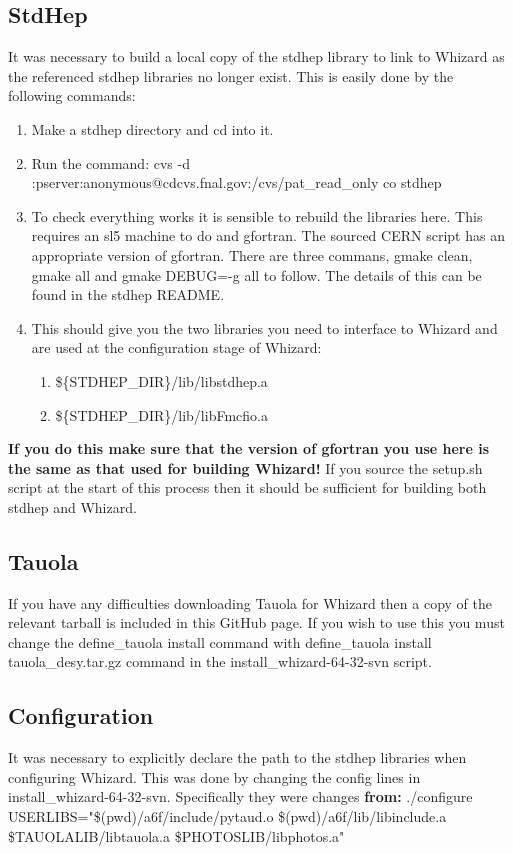 \documentclass[11pt, oneside]{article}   	%
\begin{document}
\subsection{StdHep}
It was necessary to build a local copy of the stdhep library to link to Whizard as the referenced stdhep libraries no longer exist.  This is easily done by the following commands:
\begin{enumerate}
\item Make a stdhep directory and cd into it.
\item Run the command: cvs -d :pserver:anonymous@cdcvs.fnal.gov:/cvs/pat\_read\_only co stdhep
\item To check everything works it is sensible to rebuild the libraries here.  This requires an sl5 machine to do and gfortran.  The sourced CERN script has an appropriate version of gfortran.  There are three commans, gmake clean, gmake all and gmake DEBUG=-g all to follow.  The details of this can be found in the stdhep README.
\item This should give you the two libraries you need to interface to Whizard and are used at the configuration stage of Whizard:
  \begin{enumerate}
  \item \$\{STDHEP\_DIR\}/lib/libstdhep.a
  \item  \$\{STDHEP\_DIR\}/lib/libFmcfio.a
  \end{enumerate}
\end{enumerate}
\textbf{If you do this make sure that the version of gfortran you use here is the same as that used for building Whizard!}  If you source the setup.sh script at the start of this process then it should be sufficient for building both stdhep and Whizard.

\subsection{Tauola}
If you have any difficulties downloading Tauola for Whizard then a copy of the relevant tarball is included in this GitHub page.  If you wish to use this you must change the define\_tauola install command with define\_tauola install tauola\_desy.tar.gz command in the install\_whizard-64-32-svn script. 

\subsection{Configuration}
It was necessary to explicitly declare the path to the stdhep libraries when configuring Whizard.  This was done by changing the config lines in install\_whizard-64-32-svn.  Specifically they were changes \textbf{from:}
\newline
 ./configure USERLIBS="\$(pwd)/a6f/include/pytaud.o \$(pwd)/a6f/lib/libinclude.a \$TAUOLALIB/libtauola.a \$PHOTOSLIB/libphotos.a"
\newline
\end{document}
